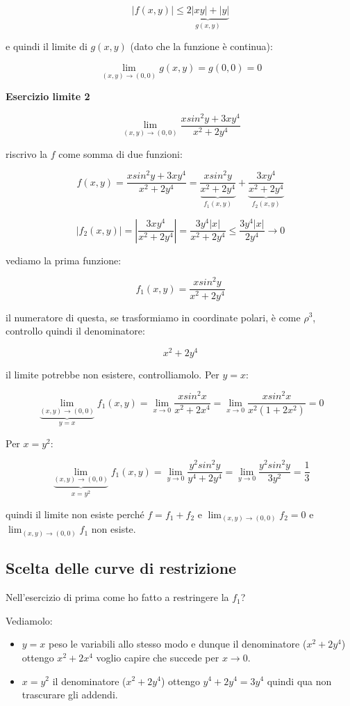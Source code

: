 \documentclass[11pt]{article}
\begin{document}
\[
   |f(x,y)|  \le \underbrace{2 |xy| + |y|}_{g(x,y)}
\]

e quindi il limite di $g(x,y)$ (dato che la funzione è continua):

\[
    \lim_{ (x,y) \to (0,0) } g(x,y) = g(0,0) = 0
\]


\textbf{Esercizio limite 2} 

\[
    \lim_{ (x,y) \to (0,0) } \frac{x sin^{2}y+ 3xy^{4}}{x^{2}+2y^{4}}  
\]

riscrivo la $f$ come somma di due funzioni:

\[
    f(x,y) = \frac{x sin^{2}y+ 3xy^{4}}{x^{2}+2y^{4}}  = \underbrace{\frac{x sin^{2}y}{x^{2}+2y^{4}}}_{f_1(x,y)} + \underbrace{\frac{3xy^{4}}{x^{2}+2y^{4}}}_{f_2(x,y)}
\]

\[
    |f_2(x,y)| = | \frac{3xy^{4}}{x^{2}+2y^{4}}| =\frac{3y^{4}|x|}{x^{2}+2y^{4}} \le \frac{3y^{4}|x|}{2y^{4}} \rightarrow 0
\]

vediamo la prima funzione:

\[
    f_1(x,y) = \frac{xsin^{2}y}{x^{2}+2y^{4}}
\]

il numeratore di questa, se trasformiamo in coordinate polari, è come $\rho^{3}$, controllo quindi il denominatore:

\[
    x^{2} + 2y^{4}
\]

il limite potrebbe non esistere, controlliamolo. Per $y=x$:

\[
    \underbrace{\lim_{ (x,y) \to (0,0) }}_{y=x} f_1(x,y) = \lim_{ x \to 0 } \frac{x sin^{2}x}{x^{2}+2x^{4}} = \lim_{ x \to 0 } \frac{x sin^{2}x}{x^{2}(1+2x^{2})} = 0
\]

Per $x = y^{2}$:

\[
    \underbrace{\lim_{ (x,y) \to (0,0) }}_{x=y^{2}} f_1(x,y)  = \lim_{ y \to 0 } \frac{y^{2}sin^{2}y}{y^{4}+2y^{4}} = \lim_{ y \to 0 } \frac{y^{2}sin^{2}y}{3y^{2}}  = \frac{1}{3}
\]

quindi il limite non esiste perché $f= f_1+f_2$ e $\lim_{ (x,y) \to (0,0) } f_2=0$ e $\lim_{ (x,y) \to (0,0) } f_1$ non esiste.

\subsection{Scelta delle curve di restrizione}

Nell'esercizio di prima come ho fatto a restringere la $f_1$?

Vediamolo:

\begin{itemize}
    \item $y=x$ peso le variabili allo stesso modo e dunque il denominatore ($x^{2}+2y^{4}$) ottengo $x^{2}+2x^{4}$ voglio capire che succede per $x \rightarrow 0$.
    \item $x=y^{2}$ il denominatore ($x^{2}+2y^{4}$) ottengo $y^{4}+2y^{4} = 3y^{4}$ quindi qua non trascurare gli addendi.
\end{itemize}
\end{document}
